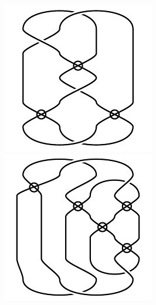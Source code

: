 \begin{figure}[H]
\begin{minipage}[b]{.18\linewidth}
\centering
\includegraphics[width=\linewidth]{../data/virtual_4_92.png}
\end{minipage}
\begin{minipage}[b]{.18\linewidth}
\centering
\includegraphics[width=\linewidth]{../data/virtual_4_93.png}

\end{minipage}
\end{figure}
